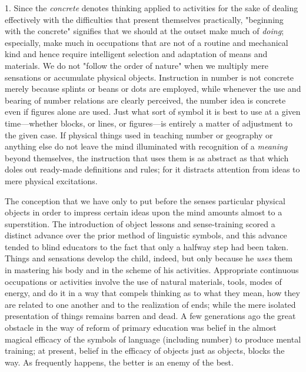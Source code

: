 \documentclass[showtrims,ustradepaper]{memoir}
\begin{document}
1. Since the \emph{concrete} denotes thinking applied to activities for
the sake of dealing effectively with the difficulties that present
themselves practically, "beginning with the concrete" signifies that we
should at the outset make much of \emph{doing}; especially, make much in
occupations that are not of a routine and mechanical kind and hence
require intelligent selection and adaptation of means and materials. We
do not "follow the order of nature" when we multiply mere sensations or
accumulate physical objects. Instruction in number is not concrete
merely because splints or beans or dots are employed, while whenever the
use and bearing of number relations are clearly perceived, the number
idea is concrete even if figures alone are used. Just what sort
of
symbol it is best to use at a given time---whether blocks, or lines, or
figures---is entirely a matter of adjustment to the given case. If
physical things used in teaching number or geography or anything else do
not leave the mind illuminated with recognition of a \emph{meaning}
beyond themselves, the instruction that uses them is as abstract as that
which doles out ready-made definitions and rules; for it distracts
attention from ideas to mere physical excitations.


The conception that we have only to put before the senses particular
physical objects in order to impress certain ideas upon the mind amounts
almost to a superstition. The introduction of object lessons and
sense-training scored a distinct advance over the prior method of
linguistic symbols, and this advance tended to blind educators to the
fact that only a halfway step had been taken. Things and sensations
develop the child, indeed, but only because he \emph{uses} them in
mastering his body and in the scheme of his activities. Appropriate
continuous occupations or activities involve the use of natural
materials, tools, modes of energy, and do it in a way that compels
thinking as to what they mean, how they are related to one another and
to the realization of ends; while the mere isolated presentation of
things remains barren and dead. A few generations ago the great obstacle
in the way of reform of primary education was belief in the almost
magical efficacy of the symbols of language (including number) to
produce mental training; at present, belief in the efficacy of objects
just as objects, blocks the way. As frequently happens, the better is an
enemy of the best.
\end{document}
